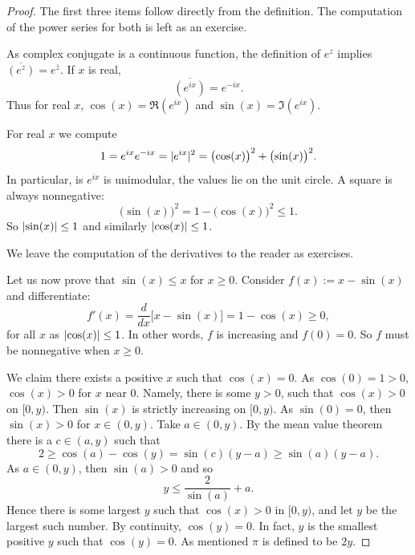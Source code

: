 \begin{proof}
The first three items follow directly from the definition.
The computation of the power series for both is left as an exercise.

As complex conjugate is a continuous function, the definition
of $e^z$ implies
$\overline{(e^z)} = e^{\bar{z}}$.  If
$x$ is real,
\begin{equation*}
\overline{(e^{ix})} = e^{-ix} .
\end{equation*}
Thus for real $x$,
$\cos(x) = \Re (e^{ix})$ and $\sin(x) = \Im (e^{ix})$.

For real $x$ we compute
\begin{equation*}
1 =  e^{ix} e^{-ix} = \lvert {e^{ix}} \rvert^2 = {\bigl( \cos(x) \bigr)}^2 + {\bigl( \sin(x) \bigr)}^2 .
\end{equation*}
In particular, is $e^{ix}$ is unimodular, the values lie on the unit circle.
A square is always nonnegative:
\begin{equation*}
{\bigl(\sin(x)\bigr)}^2 = 1-{\bigl(\cos(x)\bigr)}^2 \leq 1 .
\end{equation*}
So $\lvert {\sin(x)} \rvert \leq 1$ and similarly 
$\lvert {\cos(x)} \rvert \leq 1$.

We leave the computation of the derivatives to the reader as exercises.

Let us now prove that $\sin(x) \leq x$ for $x \geq 0$.
Consider
$f(x) := x-\sin(x)$ and differentiate:
\begin{equation*}
f'(x) = \frac{d}{dx} \bigl[ x - \sin(x) \bigr]
=
1 -\cos(x) \geq 0 ,
\end{equation*}
for all $x$ as $\lvert {\cos(x)} \rvert \leq 1$.
In other words, $f$ is increasing and $f(0) = 0$.
So $f$ must be nonnegative when $x \geq 0$.

We claim there exists a positive $x$ such that $\cos(x) = 0$.
As $\cos(0) = 1 > 0$, $\cos(x) > 0$
for $x$ near $0$.  Namely,
there is some
$y > 0$, such that $\cos(x) > 0$ on $[0,y)$.
Then $\sin(x)$ is strictly
increasing on $[0,y)$.  As $\sin(0) = 0$, then
$\sin(x) > 0$ for $x \in (0,y)$.  Take $a \in (0,y)$.  By
the mean value theorem there is a $c \in (a,y)$ such that
\begin{equation*}
2 \geq \cos(a)-\cos(y) = \sin(c)(y-a) \geq \sin(a)(y-a) .
\end{equation*}
As $a \in (0,y)$, then $\sin(a) > 0$ and so
\begin{equation*}
y \leq \frac{2}{\sin(a)} + a .
\end{equation*}
Hence there is some largest $y$ such that $\cos(x) > 0$ in $[0,y)$,
and let $y$ be the largest such number.
By continuity, $\cos(y) = 0$.
In fact, $y$ is the
smallest positive $y$ such that $\cos(y) = 0$.  As mentioned
$\pi$ is defined to be $2y$.


\end{proof}
